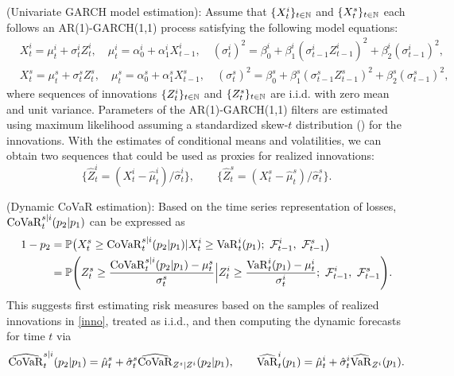 (Univariate GARCH model estimation): Assume that $\{X_t^i\}_{t\in {\mathbb N}}$ and $\{X_t^s\}_{t\in {\mathbb N}}$ each follows an AR(1)-GARCH(1,1) process \citep{Bollerslev1986} satisfying the following model equations:
\begin{align*}
&X_t^{i} = \mu_t^{i} + \sigma_t^{i}Z_t^{i}, \quad \mu_t^{i} = \alpha_0^{i} + \alpha_1^{i}X_{t-1}^{i}, \quad (\sigma_t^{i})^2 = \beta_0^{i} + \beta_1^{i}(\sigma_{t-1}^{i}Z_{t-1}^{i})^2 + \beta_2^{i}(\sigma_{t-1}^{i})^2,\\
&X_t^{s} = \mu_t^{s} + \sigma_t^{s}Z_t^{s}, \quad \mu_t^{s} = \alpha_0^{s} + \alpha_1^{s}X_{t-1}^{s}, \quad (\sigma_t^{s})^2 = \beta_0^{s} + \beta_1^{s}(\sigma_{t-1}^{s}Z_{t-1}^{s})^2 + \beta_2^{s}(\sigma_{t-1}^{s})^2,
\end{align*}
where sequences of innovations $\{Z_t^{i}\}_{t\in {\mathbb N}}$ and $\{Z_t^{s}\}_{t\in {\mathbb N}}$ are  i.i.d. with zero mean and unit variance. Parameters of the AR(1)-GARCH(1,1) filters are estimated using maximum likelihood assuming a standardized skew-$t$ distribution (\cite{FernandezSteel1998}) for the innovations. With the estimates of conditional means and volatilities, we can obtain two sequences that could be used as proxies for realized innovations: 
\begin{equation}
\label{inno}
    \bigl\{\hat{Z}_t^{i} = (X_t^{i} - \hat{\mu}_t^{i})/{\hat{\sigma}_t^{i}}\bigr\},\qquad \bigl\{\hat{Z}_t^{s} = (X_t^{s} - \hat{\mu}_t^{s})/{\hat{\sigma}_t^{s}}\bigr\}.
\end{equation}

(Dynamic CoVaR estimation): Based on the time series representation of losses, $\operatorname{CoVaR}_{t}^{s|i}(p_2|p_1)$ can be expressed as
\begin{align*}
1 - p_2  &= \pbb\bigl(X_t^s \geq \CoVaR_{t}^{s|i}(p_2|p_1) | X_t^i\geq \VaR^i_{t}(p_1);\ \FC_{t-1}^i,\   \FC_{t-1}^s\bigr)\\
&=\pbb\Bigg(Z_t^s \geq \dfrac{\CoVaR_{t}^{s|i}(p_2|p_1)-\m_t^s}{\s_t^s}\Big | Z_t^i\geq \dfrac{\VaR^i_{t}(p_1)-\m_t^i}{\s_t^i};\ \FC_{t-1}^i,\   \FC_{t-1}^s\Biggr).
\end{align*}
This suggests first estimating risk measures based on the samples of realized innovations in \eqref{inno}, treated as i.i.d., and then computing the dynamic forecasts for time $t$ via
\begin{equation}
\widehat{\operatorname{CoVaR}}_{t}^{s|i}(p_2|p_1) = \hat{\mu}_t^{s} + \hat{\sigma}_t^s \widehat{\operatorname{CoVaR}}_{Z^s|Z^i}(p_2|p_1),\qquad \widehat{\operatorname{VaR}}^i_{t}(p_1)=\hat{\mu}_t^i + \hat{\sigma}_t^i\widehat{\operatorname{VaR}}_{Z^i}(p_1).
\end{equation}


